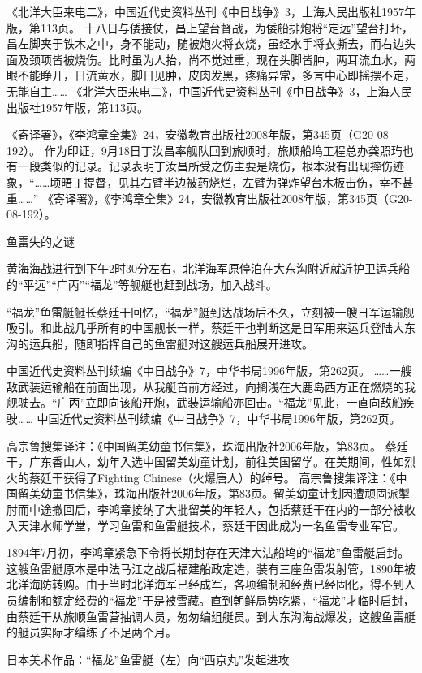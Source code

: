 \documentclass[12pt,UTF8]{ctexbook}
\begin{document}
《北洋大臣来电二》，中国近代史资料丛刊《中日战争》3，上海人民出版社1957年版，第113页。
十八日与倭接仗，昌上望台督战，为倭船排炮将“定远”望台打坏，昌左脚夹于铁木之中，身不能动，随被炮火将衣烧，虽经水手将衣撕去，而右边头面及颈项皆被烧伤。比时虽为人抬，尚不觉过重，现在头脚皆肿，两耳流血水，两眼不能睁开，日流黄水，脚日见肿，皮肉发黑，疼痛异常，多言中心即摇摆不定，无能自主…… 《北洋大臣来电二》，中国近代史资料丛刊《中日战争》3，上海人民出版社1957年版，第113页。

《寄译署》，《李鸿章全集》24，安徽教育出版社2008年版，第345页（G20-08-192）。
作为印证，9月18日丁汝昌率舰队回到旅顺时，旅顺船坞工程总办龚照玙也有一段类似的记录。记录表明丁汝昌所受之伤主要是烧伤，根本没有出现摔伤迹象，“……顷晤丁提督，见其右臂半边被药烧烂，左臂为弹炸望台木板击伤，幸不甚重……” 《寄译署》，《李鸿章全集》24，安徽教育出版社2008年版，第345页（G20-08-192）。

鱼雷失的之谜

黄海海战进行到下午2时30分左右，北洋海军原停泊在大东沟附近就近护卫运兵船的“平远”“广丙”“福龙”等舰艇也赶到战场，加入战斗。

“福龙”鱼雷艇艇长蔡廷干回忆，“福龙”艇到达战场后不久，立刻被一艘日军运输舰吸引。和此战几乎所有的中国舰长一样，蔡廷干也判断这是日军用来运兵登陆大东沟的运兵船，随即指挥自己的鱼雷艇对这艘运兵船展开进攻。

中国近代史资料丛刊续编《中日战争》7，中华书局1996年版，第262页。
……一艘敌武装运输船在前面出现，从我艇首前方经过，向搁浅在大鹿岛西方正在燃烧的我舰驶去。“广丙”立即向该船开炮，武装运输船亦回击。“福龙”见此，一直向敌船疾驶…… 中国近代史资料丛刊续编《中日战争》7，中华书局1996年版，第262页。

高宗鲁搜集译注：《中国留美幼童书信集》，珠海出版社2006年版，第83页。
蔡廷干，广东香山人，幼年入选中国留美幼童计划，前往美国留学。在美期间，性如烈火的蔡廷干获得了Fighting Chinese（火爆唐人）的绰号。 高宗鲁搜集译注：《中国留美幼童书信集》，珠海出版社2006年版，第83页。留美幼童计划因遭顽固派掣肘而中途撤回后，李鸿章接纳了大批留美的年轻人，包括蔡廷干在内的一部分被收入天津水师学堂，学习鱼雷和鱼雷艇技术，蔡廷干因此成为一名鱼雷专业军官。

1894年7月初，李鸿章紧急下令将长期封存在天津大沽船坞的“福龙”鱼雷艇启封。这艘鱼雷艇原本是中法马江之战后福建船政定造，装有三座鱼雷发射管，1890年被北洋海防转购。由于当时北洋海军已经成军，各项编制和经费已经固化，得不到人员编制和额定经费的“福龙”于是被雪藏。直到朝鲜局势吃紧，“福龙”才临时启封，由蔡廷干从旅顺鱼雷营抽调人员，匆匆编组艇员。到大东沟海战爆发，这艘鱼雷艇的艇员实际才编练了不足两个月。


日本美术作品：“福龙”鱼雷艇（左）向“西京丸”发起进攻
\end{document}
